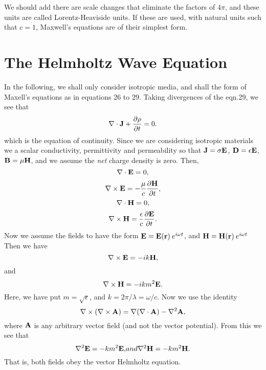 We should add there are scale changes that eliminate the factors of $4 \pi$, and these units are called
Lorentz-Heaviside units. If these are used, with natural units such that $c=1$, Maxwell's equations are of their simplest 
form.

\section{The Helmholtz Wave Equation}

In the following, we shall only consider isotropic media, and shall the form
of Maxell's equations as in equations 26 to 29.
Taking divergences of the eqn.29, we see that
\begin{equation}
\nabla \cdot {\bf J}+\frac{\partial \rho}{\partial t}=0.
\end{equation}
which is the equation of continuity. Since we are considering isotropic materials
we a scalar conductivity, permittivity and permeability so that 
${\bf J}=\sigma {\bf E}$,
${\bf D}=\epsilon  {\bf E}$,
${\bf B}=\mu {\bf H}$, and we assume the {\it net} charge density is zero.
Then,
\begin{equation}
 \nabla \cdot {\bf E}= 0, 
\end{equation}
\begin{equation}
\nabla \times {\bf E}=- \frac{\mu}{c} \frac{\partial {\bf H}}{\partial t},
\end{equation}
\begin{equation}
 \nabla \cdot {\bf H}=0,
\end{equation}
\begin{equation}
\nabla \times {\bf H}= 
\frac{\epsilon}{c} \frac{\partial {\bf E}}{\partial t}.
\end{equation}
Now we assume the fields to have the form 
${\bf E}={\bf E}({\bf r}) \> e^{i \omega t}$, and
${\bf H}={\bf H}({\bf r}) \> e^{i \omega t}$
Then we have
\begin{equation}
\nabla \times {\bf E}=- i k {\bf H},
\end{equation}
and
\begin{equation}
\nabla \times {\bf H}=- i k m^2 {\bf E}.
\end{equation}
Here, we have put $m=\sqrt{\epsilon}$, and $k=2 \pi / \lambda=\omega/c$.
Now we use the identity
\begin{equation}
\nabla \times (\nabla \times {\bf A})=\nabla (\nabla \cdot {\bf A} )
 -\nabla^2 {\bf A},
\end{equation}
where ${\bf A}$ is any arbitrary vector field (and not the vector potential).
From this we see that
\begin{equation}
\nabla^2 {\bf E}= -km^2 {\bf E}, 
$$   and $$
\nabla^2 {\bf H}= -km^2 {\bf H}. 
\end{equation}
That is, both fields obey the vector Helmholtz equation.

